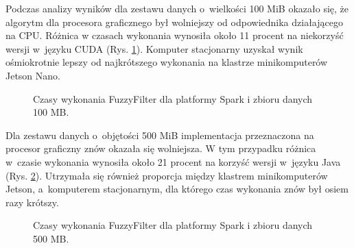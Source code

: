 Podczas analizy wyników dla zestawu danych o~wielkości 100 MiB okazało się, że algorytm dla procesora
graficznego był wolniejszy od odpowiednika działającego na CPU. Różnica w czasach wykonania wynosiła
około 11 procent na niekorzyść wersji w~języku CUDA (Rys. \ref{fig:fuzzyfilter:100M}). Komputer stacjonarny
uzyskał wynik ośmiokrotnie lepszy od najkrótszego wykonania na klastrze minikomputerów Jetson Nano.

\begin{figure}[h]
    \centering
    \caption{Czasy wykonania FuzzyFilter dla platformy Spark i zbioru danych 100 MB.}
    \label{fig:fuzzyfilter:100M}
\end{figure}
\newpage

Dla zestawu danych o~objętości 500 MiB implementacja przeznaczona na procesor graficzny znów okazała
się wolniejsza. W tym przypadku różnica w~czasie wykonania wynosiła około 21 procent na korzyść wersji
w~języku Java (Rys. \ref{fig:fuzzyfilter:500M}). Utrzymała się również proporcja między klastrem minikomputerów Jetson, a~komputerem
stacjonarnym, dla którego czas wykonania znów był osiem razy krótszy.

\begin{figure}[h!]
    \centering
    \caption{Czasy wykonania FuzzyFilter dla platformy Spark i zbioru danych 500 MB.}
    \label{fig:fuzzyfilter:500M}
\end{figure}

